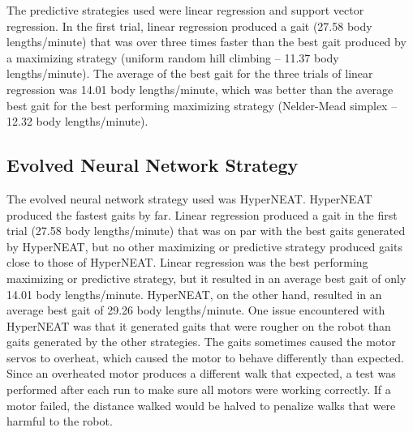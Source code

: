 The predictive strategies used were linear regression and support
vector regression. In the first trial, linear regression produced a
gait (27.58 body lengths/minute) that was over three times faster than
the best gait produced by a maximizing strategy (uniform random hill
climbing -- 11.37 body lengths/minute). The average of the best gait
for the three trials of linear regression was 14.01 body
lengths/minute, which was better than the average best gait for the
best performing maximizing strategy (Nelder-Mead simplex -- 12.32 body
lengths/minute).

%
%



\subsection{Evolved Neural Network Strategy}

The evolved neural network strategy used was HyperNEAT. HyperNEAT
produced the fastest gaits by far. Linear regression produced a gait
in the first trial (27.58 body lengths/minute) that was on par with
the best gaits generated by HyperNEAT, but no other maximizing or
predictive strategy produced gaits close to those of HyperNEAT. Linear
regression was the best performing maximizing or predictive strategy,
but it resulted in an average best gait of only 14.01 body
lengths/minute. HyperNEAT, on the other hand, resulted in an average
best gait of 29.26 body lengths/minute. One issue encountered with
HyperNEAT was that it generated gaits that were rougher on the robot
than gaits generated by the other strategies. The gaits sometimes
caused the motor servos to overheat, which caused the motor to behave
differently than expected. Since an overheated motor produces a
different walk that expected, a test was performed after each run to
make sure all motors were working correctly. If a motor failed, the
distance walked would be halved to penalize walks that were harmful to
the robot.

